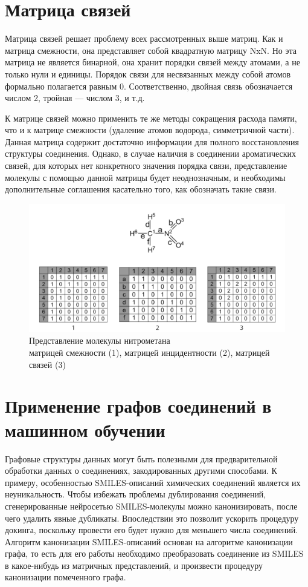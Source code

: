 \documentclass[a4paper,14pt]{extreport}
\begin{document}
  \section{Матрица связей}
  \label{s:matrix_4_sec}
  Матрица связей решает проблему всех рассмотренных выше матриц. Как и матрица смежности, она представляет собой квадратную матрицу NxN. Но эта матрица не является бинарной, она хранит порядки связей между атомами, а не только нули и единицы. Порядок связи для несвязанных между собой атомов формально полагается равным 0. Соответственно, двойная связь обозначается числом 2, тройная — числом 3, и т.д.

К матрице связей можно применить те же методы сокращения расхода памяти, что и к матрице смежности (удаление атомов водорода, симметричной части). Данная матрица содержит достаточно информации для полного восстановления структуры соединения. Однако, в случае наличия в соединении ароматических связей, для которых нет конкретного значения порядка связи, представление молекулы с помощью данной матрицы будет неоднозначным, и необходимы дополнительные соглашения касательно того, как обозначать такие связи.
\begin{figure}[htp]
\centering
\includegraphics[scale=0.35]{images/нитрометан.png}
\caption{Представление молекулы нитрометана \\матрицей смежности (1), матрицей инцидентности (2), матрицей связей (3)}
\label{nitromethane}
\end{figure}

  \section{Применение графов соединений в машинном обучении}
  \label{s:graphs_applications}
Графовые структуры данных могут быть полезными для предварительной обработки данных о соединениях, закодированных другими способами. К примеру, особенностью SMILES-описаний химических соединений является их неуникальность. Чтобы избежать проблемы дублирования соединений, сгенерированные нейросетью SMILES-молекулы можно канонизировать, после чего удалить явные дубликаты. Впоследствии это позволит ускорить процедуру докинга, поскольку провести его будет нужно для меньшего числа соединений. Алгоритм канонизации SMILES-описаний основан на алгоритме канонизации графа, то есть для его работы необходимо преобразовать соединение из SMILES в какое-нибудь из матричных представлений, и произвести процедуру канонизации помеченного графа.
\end{document}
